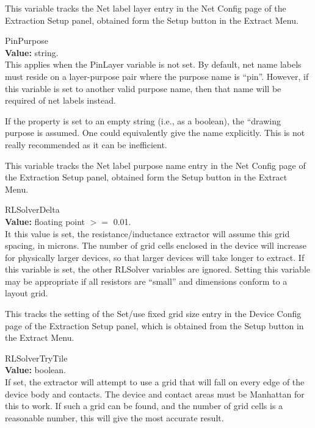 \begin{description}
This variable tracks the {\cb Net label layer} entry in the
{\cb Net Config} page of the {\cb Extraction Setup} panel, obtained
form the {\cb Setup} button in the {\cb Extract Menu}.

\item{\et PinPurpose}\\
{\bf Value:} string.\\
This applies when the {\et PinLayer} variable is not set.  By default,
net name labels must reside on a layer-purpose pair where the purpose
name is ``{\vt pin}''.  However, if this variable is set to another
valid purpose name, then that name will be required of net labels
instead.
 
If the property is set to an empty string (i.e., as a boolean), the
``{\vt drawing} purpose is assumed.  One could equivalently give the
name explicitly.  This is not really recommended as it can be
inefficient.
 
This variable tracks the {\cb Net label purpose name} entry in the
{\cb Net Config} page of the {\cb Extraction Setup} panel, obtained
form the {\cb Setup} button in the {\cb Extract Menu}.

\item{\et RLSolverDelta}\\
{\bf Value:} floating point $>=$ 0.01.\\
It this value is set, the resistance/inductance extractor will assume
this grid spacing, in microns.  The number of grid cells enclosed in
the device will increase for physically larger devices, so that larger
devices will take longer to extract.  If this variable is set, the
other {\et RLSolver} variables are ignored.  Setting this variable may
be appropriate if all resistors are ``small'' and dimensions conform
to a layout grid.

This tracks the setting of the {\cb Set/use fixed grid size} entry in
the {\cb Device Config} page of the {\cb Extraction Setup} panel,
which is obtained from the {\cb Setup} button in the {\cb Extract
Menu}.

\item{\et RLSolverTryTile}\\
{\bf Value:} boolean.\\
If set, the extractor will attempt to use a grid that will fall on
every edge of the device body and contacts.  The device and contact
areas must be Manhattan for this to work.  If such a grid can be
found, and the number of grid cells is a reasonable number, this will
give the most accurate result.


\end{description}
